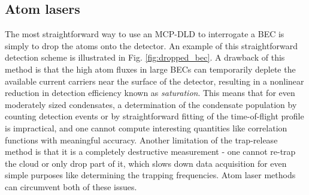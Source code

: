 \subsection*{Atom lasers}



	The most straightforward way to use an MCP-DLD to interrogate a BEC is simply to drop the atoms onto the detector. An example of this straightforward detection scheme is illustrated in Fig. \ref{fig:dropped_bec}. A drawback of this method is that the high atom fluxes in large BECs can temporarily deplete the available current carriers near the surface of the detector, resulting in a nonlinear reduction in detection efficiency known as \emph{saturation}. This means that for even moderately sized condensates, a determination of the condensate population by counting detection events or by straightforward fitting of the time-of-flight profile is impractical, and one cannot compute interesting quantities like correlation functions with meaningful accuracy. Another limitation of the trap-release method is that it is a completely destructive measurement - one cannot re-trap the cloud or only drop part of it, which slows down data acquisition for even simple purposes like determining the trapping frequencies. Atom laser methods can circumvent both of these issues. 

